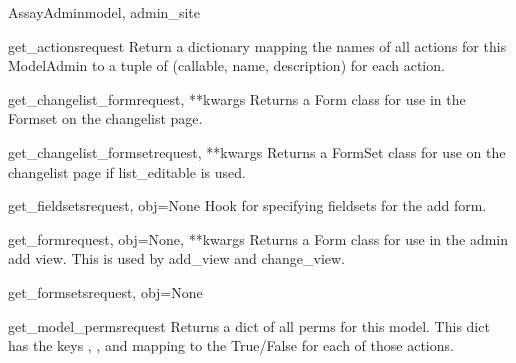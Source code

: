 \documentclass[letterpaper,10pt,english]{sphinxmanual}
\begin{document}
\begin{classdesc}{AssayAdmin}{model, admin\_site}
\hypertarget{data.admin.AssayAdmin.get_actions}{}\begin{methoddesc}{get\_actions}{request}
Return a dictionary mapping the names of all actions for this
ModelAdmin to a tuple of (callable, name, description) for each action.
\end{methoddesc}

\hypertarget{data.admin.AssayAdmin.get_changelist_form}{}\begin{methoddesc}{get\_changelist\_form}{request, **kwargs}
Returns a Form class for use in the Formset on the changelist page.
\end{methoddesc}

\hypertarget{data.admin.AssayAdmin.get_changelist_formset}{}\begin{methoddesc}{get\_changelist\_formset}{request, **kwargs}
Returns a FormSet class for use on the changelist page if list\_editable
is used.
\end{methoddesc}

\hypertarget{data.admin.AssayAdmin.get_fieldsets}{}\begin{methoddesc}{get\_fieldsets}{request, obj=None}
Hook for specifying fieldsets for the add form.
\end{methoddesc}

\hypertarget{data.admin.AssayAdmin.get_form}{}\begin{methoddesc}{get\_form}{request, obj=None, **kwargs}
Returns a Form class for use in the admin add view. This is used by
add\_view and change\_view.
\end{methoddesc}

\hypertarget{data.admin.AssayAdmin.get_formsets}{}\begin{methoddesc}{get\_formsets}{request, obj=None}\end{methoddesc}

\hypertarget{data.admin.AssayAdmin.get_model_perms}{}\begin{methoddesc}{get\_model\_perms}{request}
Returns a dict of all perms for this model. This dict has the keys
, , and  mapping to the True/False for each
of those actions.
\end{methoddesc}


\end{classdesc}
\end{document}
